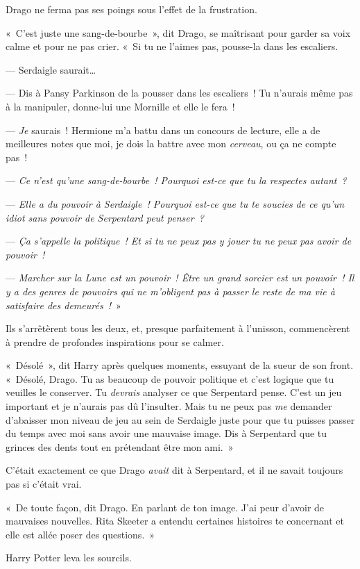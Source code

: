 Drago ne ferma pas ses poings sous l'effet de la frustration.

«~C'est juste une sang-de-bourbe~», dit Drago, se maîtrisant pour garder sa voix calme et pour ne pas crier. «~Si tu ne l'aimes pas, pousse-la dans les escaliers.

--- Serdaigle saurait…

--- Dis à Pansy Parkinson de la pousser dans les escaliers~! Tu n'aurais même pas à la manipuler, donne-lui une Mornille et elle le fera~!

--- \emph{Je} saurais~! Hermione m'a battu dans un concours de lecture, elle a de meilleures notes que moi, je dois la battre avec mon \emph{cerveau}, ou ça ne compte pas~!

--- \emph{Ce n'est qu'une sang-de-bourbe~! Pourquoi est-ce que tu la respectes autant~?}

--- \emph{Elle a du pouvoir à Serdaigle~! Pourquoi est-ce que tu te soucies de ce qu'un idiot sans pouvoir de Serpentard peut penser~?}

--- \emph{Ça s'appelle la politique~! Et si tu ne peux pas y jouer tu ne peux pas avoir de pouvoir~!}

--- \emph{Marcher sur la Lune est un pouvoir~! Être un grand sorcier est un pouvoir~! Il y a des genres de pouvoirs qui ne m'obligent pas à passer le reste de ma vie à satisfaire des demeurés~!}~»

Ils s'arrêtèrent tous les deux, et, presque parfaitement à l'unisson, commencèrent à prendre de profondes inspirations pour se calmer.

«~Désolé~», dit Harry après quelques moments, essuyant de la sueur de son front. «~Désolé, Drago. Tu as beaucoup de pouvoir politique et c'est logique que tu veuilles le conserver. Tu \emph{devrais} analyser ce que Serpentard pense. C'est un jeu important et je n'aurais pas dû l'insulter. Mais tu ne peux pas \emph{me} demander d'abaisser mon niveau de jeu au sein de Serdaigle juste pour que tu puisses passer du temps avec moi sans avoir une mauvaise image. Dis à Serpentard que tu grinces des dents tout en prétendant être mon ami.~»

C'était exactement ce que Drago \emph{avait} dit à Serpentard, et il ne savait toujours pas si c'était vrai.

«~De toute façon, dit Drago. En parlant de ton image. J'ai peur d'avoir de mauvaises nouvelles. Rita Skeeter a entendu certaines histoires te concernant et elle est allée poser des questions.~»

Harry Potter leva les sourcils.

